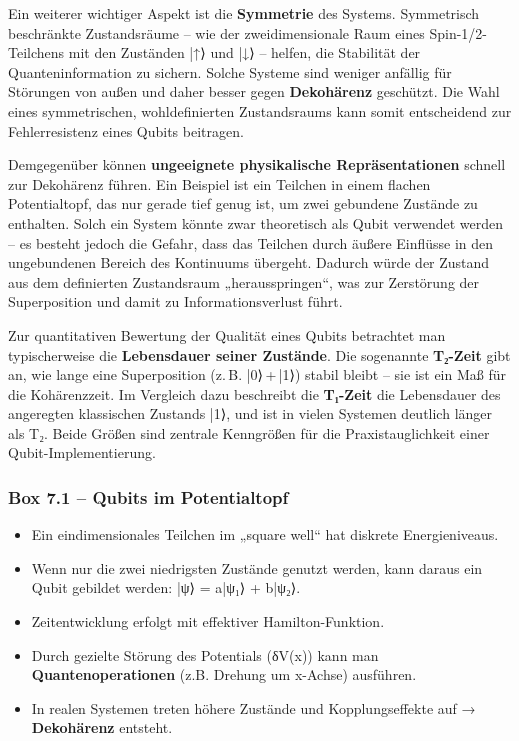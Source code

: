 Ein weiterer wichtiger Aspekt ist die \textbf{Symmetrie} des Systems. Symmetrisch beschränkte Zustandsräume – wie der zweidimensionale Raum eines Spin-1/2-Teilchens mit den Zuständen |↑⟩ und |↓⟩ – helfen, die Stabilität der Quanteninformation zu sichern. Solche Systeme sind weniger anfällig für Störungen von außen und daher besser gegen \textbf{Dekohärenz} geschützt. Die Wahl eines symmetrischen, wohldefinierten Zustandsraums kann somit entscheidend zur Fehlerresistenz eines Qubits beitragen.

Demgegenüber können \textbf{ungeeignete physikalische Repräsentationen} schnell zur Dekohärenz führen. Ein Beispiel ist ein Teilchen in einem flachen Potentialtopf, das nur gerade tief genug ist, um zwei gebundene Zustände zu enthalten. Solch ein System könnte zwar theoretisch als Qubit verwendet werden – es besteht jedoch die Gefahr, dass das Teilchen durch äußere Einflüsse in den ungebundenen Bereich des Kontinuums übergeht. Dadurch würde der Zustand aus dem definierten Zustandsraum „herausspringen“, was zur Zerstörung der Superposition und damit zu Informationsverlust führt.

Zur quantitativen Bewertung der Qualität eines Qubits betrachtet man typischerweise die \textbf{Lebensdauer seiner Zustände}. Die sogenannte \textbf{T₂-Zeit} gibt an, wie lange eine Superposition (z. B. |0⟩ + |1⟩) stabil bleibt – sie ist ein Maß für die Kohärenzzeit. Im Vergleich dazu beschreibt die \textbf{T₁-Zeit} die Lebensdauer des angeregten klassischen Zustands |1⟩, und ist in vielen Systemen deutlich länger als T₂. Beide Größen sind zentrale Kenngrößen für die Praxistauglichkeit einer Qubit-Implementierung.

 


\subsubsection{ \textbf{Box 7.1 – Qubits im Potentialtopf}}

\begin{itemize}
    \item Ein eindimensionales Teilchen im „square well“ hat diskrete Energieniveaus.
    \item Wenn nur die zwei niedrigsten Zustände genutzt werden, kann daraus ein Qubit gebildet werden: |ψ⟩ = a|ψ₁⟩ + b|ψ₂⟩.
    \item Zeitentwicklung erfolgt mit effektiver Hamilton-Funktion.
    \item Durch gezielte Störung des Potentials (δV(x)) kann man \textbf{Quantenoperationen} (z.B. Drehung um x-Achse) ausführen.
    \item In realen Systemen treten höhere Zustände und Kopplungseffekte auf → \textbf{Dekohärenz} entsteht.
\end{itemize}
 

